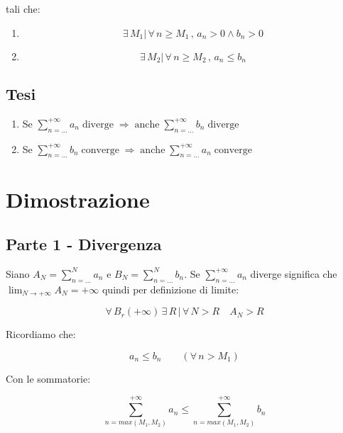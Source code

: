 \documentclass[../dimostrazioni]{subfiles}
\begin{document}
                tali che:
                \begin{enumerate}
                    \indentitem \item \[\exists \, M_1 | \, \forall \, n \geqslant M_1\,,\, a_n > 0 \land b_n > 0  \]
                    \indentitem \item \[\exists \, M_2 | \, \forall \, n \geqslant M_2\,,\, a_n \leqslant b_n \]
                \end{enumerate}
                
            \subsection*{Tesi}
                \begin{enumerate}
                    \indentitem \item Se \(\sum_{n=\dots}^{+\infty} a_n \; \text{diverge} \; \Rightarrow \; \text{anche} \; \sum_{n=\dots}^{+\infty} b_n \; \text{diverge} \)
                    \indentitem \item Se \(\sum_{n=\dots}^{+\infty} b_n \; \text{converge} \; \Rightarrow \; \text{anche} \; \sum_{n=\dots}^{+\infty} a_n \; \text{converge} \)
                \end{enumerate}
                

        \section*{Dimostrazione}

            \subsection*{Parte 1 - Divergenza}

                Siano \(A_N = \sum_{n=\dots}^{N} a_n\) e \(B_N = \sum_{n=\dots}^{N} b_n\). 
                Se \(\sum_{n=\dots}^{+\infty} a_n\) diverge significa che \(\lim_{N \to +\infty} A_N = +\infty\) 
                quindi per definizione di limite:

                \[\forall \, B_r(+\infty) \, \exists \, R \, | \,\forall \, N > R  \quad A_N > R\]

                Ricordiamo che:

                \[ a_n \leqslant b_n \qquad (\forall \, n > M_1) \]

                Con le sommatorie:

                \[ \sum_{n = max(M_1,M_2)}^{+\infty} a_n \leqslant \sum_{n = max(M_1,M_2)}^{+\infty} b_n\]
\end{document}
